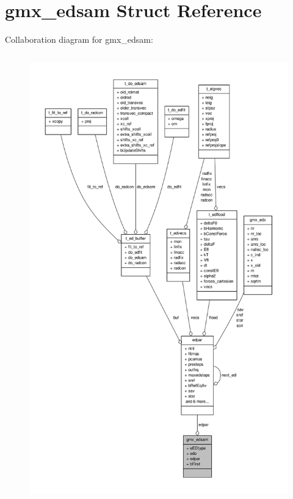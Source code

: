 \hypertarget{structgmx__edsam}{\section{gmx\-\_\-edsam \-Struct \-Reference}
\label{structgmx__edsam}
}


\-Collaboration diagram for gmx\-\_\-edsam\-:
\nopagebreak
\begin{figure}[H]
\begin{center}
\leavevmode
\includegraphics[height=550pt]{structgmx__edsam__coll__graph}
\end{center}
\end{figure}
